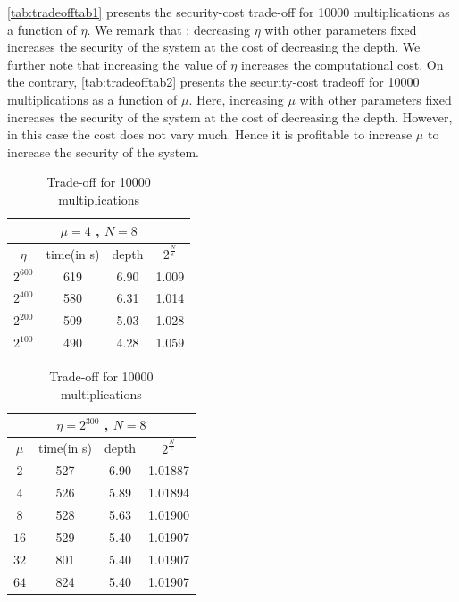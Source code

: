 \documentclass{acm_proc_article-sp}
\begin{document}
\autoref{tab:tradeofftab1} presents the security-cost trade-off for 10000 multiplications as a function of $\eta$. We remark that : decreasing $\eta$ with other parameters fixed increases the security of the system at the cost of decreasing the depth.  We further note that increasing the value of $\eta$ increases the computational cost. On the contrary, \autoref{tab:tradeofftab2} presents the security-cost tradeoff for 10000 multiplications as a function of $\mu$. Here, increasing $\mu$ with other parameters fixed increases the security of the system at the cost of decreasing the depth. However, in this case the cost does not vary much. Hence it is profitable to increase $\mu$ to increase the security of the system.

\begin{table}[htb]
  \centering
  \caption{Trade-off for 10000 multiplications}
\begin{tabular}{|c|c|c|c||}
  \hline
  \multicolumn{4}{|c||}{$\mu = 4$ , $N=8$} \\
  \hline
  $\eta$ &  time(in s)  & depth & $2^{\frac{N}{\epsilon}}$ \\
  \hline
  $2^{600}$ & 619  & 6.90 & 1.009 \\
  $2^{400}$ &  580 & 6.31 & 1.014 \\
  $2^{200}$ &  509 & 5.03 & 1.028 \\
  $2^{100}$ &  490 & 4.28 & 1.059 \\
   \hline
\end{tabular}
\normalsize
\label{tab:tradeofftab1}
\end{table}

\begin{table}[htb]
  \centering
  \caption{Trade-off for 10000 multiplications}
\begin{tabular}{|c|c|c|c||}
  \hline
  \multicolumn{4}{|c||}{$\eta = 2^{300}$ , $N=8$} \\
  \hline
  $\mu$ &  time(in s)  & depth & $2^{\frac{N}{\epsilon}}$ \\
  \hline
  $2$ & 527  & 6.90 & 1.01887 \\
  $4$ & 526 & 5.89 & 1.01894 \\
  $8$ & 528  & 5.63 & 1.01900 \\
  $16$ & 529  & 5.40 & 1.01907 \\
  $32$ & 801  & 5.40 & 1.01907 \\
  $64$ & 824  & 5.40 & 1.01907 \\

   \hline
\end{tabular}
\normalsize
\label{tab:tradeofftab2}
\end{table}
\end{document}
